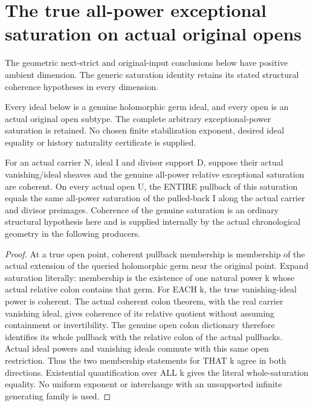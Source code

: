 \section{The true all-power exceptional saturation on actual original opens}

The geometric next-strict and original-input conclusions below have positive
ambient dimension. The generic saturation identity retains its stated
structural coherence hypotheses in every dimension.

Every ideal below is a genuine holomorphic germ ideal, and every open is an
actual original open subtype. The complete arbitrary exceptional-power
saturation is retained. No chosen finite stabilization exponent, desired
ideal equality or history naturality certificate is supplied.

\begin{theorem}
\label{hir:sharp-actual-all-power-saturation-open-naturality}
\leanok
For an actual carrier N, ideal I and divisor support D, suppose their actual
vanishing/ideal sheaves and the genuine all-power relative exceptional
saturation are coherent. On every actual open U, the ENTIRE pullback of this
saturation equals the same all-power saturation of the pulled-back I along
the actual carrier and divisor preimages. Coherence of the genuine saturation
is an ordinary structural hypothesis here and is supplied internally by the
actual chronological geometry in the following producers.
\end{theorem}
\begin{proof}
At a true open point, coherent pullback membership is membership of the
actual extension of the queried holomorphic germ near the original point.
Expand saturation literally: membership is the existence of one natural
power k whose actual relative colon contains that germ. For EACH k, the
true vanishing-ideal power is coherent. The actual coherent colon theorem,
with the real carrier vanishing ideal, gives coherence of its relative
quotient without assuming containment or invertibility. The genuine open
colon dictionary therefore identifies its whole pullback with the relative
colon of the actual pullbacks. Actual ideal powers and vanishing ideals
commute with this same open restriction. Thus the two membership statements
for THAT k agree in both directions. Existential quantification over ALL k
gives the literal whole-saturation equality. No uniform exponent or
interchange with an unsupported infinite generating family is used.
\end{proof}

